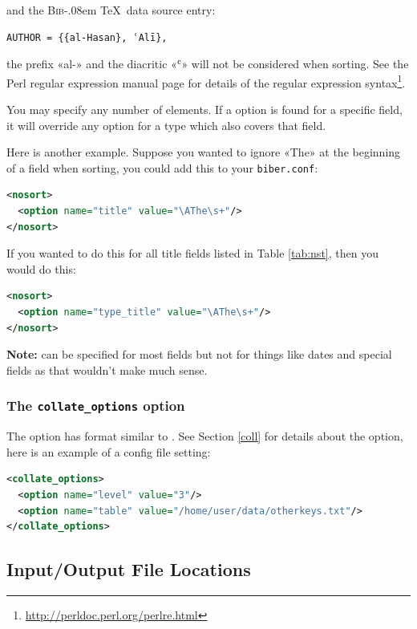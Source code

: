 \documentclass{ltxdockit}
\def\BibTeX{\textsc{Bib}\kern-.08em \TeX}
\begin{document}
\noindent and the \BibTeX\ data source entry:

\begin{verbatim}
AUTHOR = {{al-Hasan}, ʿAlī},
\end{verbatim}

\noindent the prefix «al-» and the diacritic «ʿ» will not be considered
when sorting. See the Perl regular expression manual page for
details of the regular expression syntax\footnote{\url{http://perldoc.perl.org/perlre.html}}.

You may specify any number of  elements. If a
 option is found for a specific field, it will override
any option for a type which also covers that field.

Here is another example. Suppose you wanted to ignore «The» at the
beginning of a  field when sorting, you could add this to your
\verb+biber.conf+:

\begin{lstlisting}[language=xml]
<nosort>
  <option name="title" value="\AThe\s+"/>
</nosort>
\end{lstlisting}

\noindent If you wanted to do this for all title fields listed in Table
\ref{tab:nst}, then you would do this:

\begin{lstlisting}[language=xml]
<nosort>
  <option name="type_title" value="\AThe\s+"/>
</nosort>
\end{lstlisting}

\noindent \textbf{Note:}  can be specified for most fields but
not for things like dates and special fields as that wouldn't make much sense.
\bigskip
\subsubsection{The \texttt{collate\_options} option}

The  option has format similar to
. See Section \ref{coll} for details about the option,
here is an example of a config file setting:

\begin{lstlisting}[language=xml]
<collate_options>
  <option name="level" value="3"/>
  <option name="table" value="/home/user/data/otherkeys.txt"/>
</collate_options>
\end{lstlisting}
\bigskip
\subsection{Input/Output File Locations}
\end{document}
